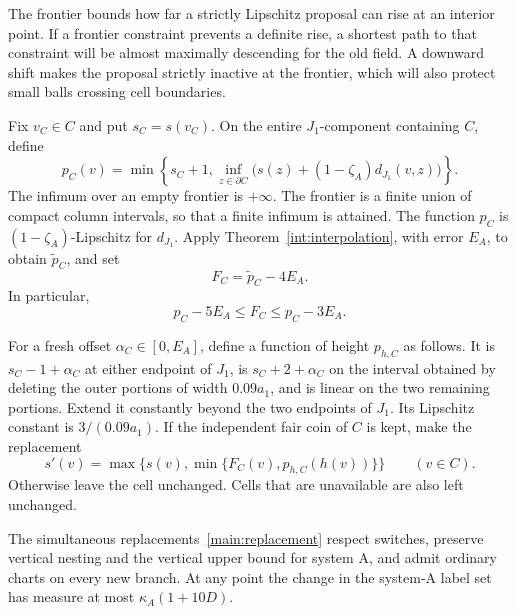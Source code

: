 The frontier bounds how far a strictly Lipschitz proposal can rise at an
interior point. If a frontier constraint prevents a definite rise, a
shortest path to that constraint will be almost maximally descending
for the old field. A downward shift makes the proposal strictly inactive
at the frontier, which will also protect small balls crossing cell boundaries.

Fix $v_C\in C$ and put $s_C=s(v_C)$.  On the entire $J_1$-component
containing $C$, define
\begin{equation}
 p_C(v)=\min\left\{s_C+1,
       \inf_{z\in\partial C}
       \bigl(s(z)+(1-\zeta_A)d_{J_1}(v,z)\bigr)\right\}.
 \label{main:frontier-extension}
\end{equation}
The infimum over an empty frontier is $+\infty$.  The frontier is a
finite union of compact column intervals, so that a finite infimum
is attained.  The function $p_C$ is $(1-\zeta_A)$-Lipschitz for
$d_{J_1}$.  Apply Theorem~\ref{int:interpolation}, with error $E_A$,
to obtain $\widetilde p_C$, and set
\begin{equation}
 F_C=\widetilde p_C-4E_A.
 \label{main:F}
\end{equation}
In particular,
\begin{equation}
 p_C-5E_A\le F_C\le p_C-3E_A.
 \label{main:F-error}
\end{equation}

For a fresh offset $\alpha_C\in[0,E_A]$, define a function of height
$p_{h,C}$ as follows.  It is $s_C-1+\alpha_C$ at either endpoint of
$J_1$, is $s_C+2+\alpha_C$ on the interval obtained by deleting
the outer portions of width $0.09a_1$, and is linear on the two
remaining portions.  Extend it constantly beyond the two endpoints
of $J_1$.  Its Lipschitz constant is $3/(0.09a_1)$.
If the independent fair coin of $C$ is kept, make the replacement
\begin{equation}
 s'(v)=\max\{s(v),\min\{F_C(v),p_{h,C}(h(v))\}\}
 \qquad(v\in C).
 \label{main:replacement}
\end{equation}
Otherwise leave the cell unchanged.  Cells that are unavailable
are also left unchanged.

\begin{lemma}
\label{main:validity}
The simultaneous replacements~\eqref{main:replacement} respect
switches, preserve vertical nesting and the vertical upper bound
for system A, and admit ordinary charts on every new branch.
At any point the change in the system-A label set has measure at most
$\kappa_A(1+10D)$.
\end{lemma}


